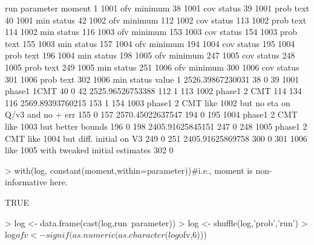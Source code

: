 \begin{Schunk}
\begin{Soutput}
     run parameter  moment
1   1001       ofv minimum
38  1001       cov  status
39  1001      prob    text
40  1001       min  status
42  1002       ofv minimum
112 1002       cov  status
113 1002      prob    text
114 1002       min  status
116 1003       ofv minimum
153 1003       cov  status
154 1003      prob    text
155 1003       min  status
157 1004       ofv minimum
194 1004       cov  status
195 1004      prob    text
196 1004       min  status
198 1005       ofv minimum
247 1005       cov  status
248 1005      prob    text
249 1005       min  status
251 1006       ofv minimum
300 1006       cov  status
301 1006      prob    text
302 1006       min  status
                                                          value
1                                              2526.39867230031
38                                                            0
39                                             1001 phase1 1CMT
40                                                            0
42                                             2525.96526753388
112                                                           1
113                                           1002 phase1 2 CMT
114                                                         134
116                                            2569.89393760215
153                                                           1
154 1003 phase1 2 CMT like 1002 but no eta on Q/v3 and no + err
155                                                           0
157                                            2570.45022637547
194                                                           0
195               1004 phase1 2 CMT like 1003 but better bounds
196                                                           0
198                                            2405.91625845151
247                                                           0
248         1005 phase1 2 CMT like 1004 but diff. initial on V3
249                                                           0
251                                            2405.91625869758
300                                                           0
301               1006 like 1005 with tweaked initial estimates
302                                                           0
\end{Soutput}
\begin{Sinput}
> with(log, constant(moment,within=parameter))#i.e., moment is non-informative here.
\end{Sinput}
\begin{Soutput}
[1] TRUE
\end{Soutput}
\begin{Sinput}
> log <- data.frame(cast(log,run~parameter))
> log <- shuffle(log,'prob','run')
> log$ofv <- signif(as.numeric(as.character(log$ofv,6)))
\end{Sinput}
\end{Schunk}
